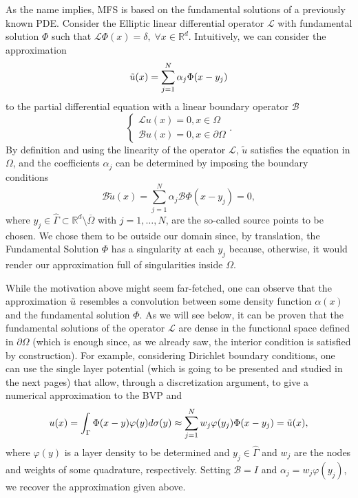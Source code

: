 As the name implies, MFS is based on the fundamental solutions of a previously known PDE. Consider the Elliptic linear differential operator \(\mathcal{L}\) with fundamental solution \(\Phi\) such that \(\mathcal{L}\Phi(x) = \delta, \; \forall x \in \mathbb{R}^d\). Intuitively, we can consider the approximation
\[
\Tilde{u}(x) = \sum_{j=1}^{N}\alpha_j \Phi(x-y_j)
\]
to the partial differential equation with a linear boundary operator \(\mathcal{B}\)
\[
\begin{cases}
    \mathcal{L}u(x) = 0, x \in \Omega\\
    \mathcal{B}u(x) = 0, x \in \partial\Omega
\end{cases}. 
\]
By definition and using the linearity of the operator \(\mathcal{L}\), \(\tilde{u}\) satisfies the equation in \(\Omega\), and the coefficients \(\alpha_j\) can be determined by imposing the boundary conditions
\[
    \mathcal{B}\tilde{u}(x)=\sum_{j=1}^{N}\alpha_j \mathcal{B}\Phi(x-y_j)=0,
\]
where \(y_j \in \hat{\Gamma} \subset \mathbb{R}^d\setminus \overline{\Omega}\) with \(j=1,\dots,N\), are the so-called source points to be chosen. We chose them to be outside our domain since, by translation, the Fundamental Solution \(\Phi\) has a singularity at each \(y_j\) because, otherwise, it would render our approximation full of singularities inside \(\Omega\). 
\begin{remark}
    While the motivation above might seem far-fetched, one can observe that the approximation \(\Tilde{u}\) resembles a convolution between some density function \(\alpha(x)\) and the fundamental solution \(\Phi\). As we will see below, it can be proven that the fundamental solutions of the operator \(\mathcal{L}\) are dense in the functional space defined in \(\partial\Omega\) (which is enough since, as we already saw, the interior condition is satisfied by construction). For example, considering Dirichlet boundary conditions, one can use the single layer potential (which is going to be presented and studied in the next pages) that allow, through a discretization argument, to give a numerical approximation to the BVP and
    \begin{equation}\label{mfs_approx_disc}
        u(x) = \int_{\Gamma}\Phi(x-y)\varphi(y)d\sigma(y) \approx \sum_{j=1}^{N}w_j \varphi(y_j) \Phi(x-y_j) = \Tilde{u}(x), 
    \end{equation}
    where \(\varphi(y)\) is a layer density to be determined and \(y_j \in \hat{\Gamma}\) and \(w_j\) are the nodes and weights of some quadrature, respectively. Setting \(\mathcal{B} = I\) and \(\alpha_j = w_j \varphi(y_j)\), we recover the approximation given above.
\end{remark}
